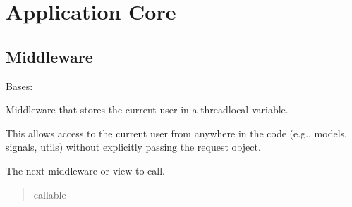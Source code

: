\documentclass[letterpaper,10pt,english]{sphinxmanual}
\begin{document}
\sphinxstepscope


\chapter{Application Core}
\label{\detokenize{core:application-core}}\label{\detokenize{core::doc}}

\section{Middleware}
\label{\detokenize{core:module-core.middleware}}\label{\detokenize{core:middleware}}

\begin{fulllineitems}
\label{\detokenize{core:core.middleware.CurrentUserMiddleware}}
\pysigstartsignatures
\pysiglinewithargsret
{}
{}
{}
\pysigstopsignatures
\sphinxAtStartPar
Bases: 

\sphinxAtStartPar
Middleware that stores the current user in a thread\sphinxhyphen{}local variable.

\sphinxAtStartPar
This allows access to the current user from anywhere in the code
(e.g., models, signals, utils) without explicitly passing the request object.

\begin{fulllineitems}
\label{\detokenize{core:core.middleware.CurrentUserMiddleware.get_response}}
\pysigstartsignatures
\pysigline
{}
\pysigstopsignatures
\sphinxAtStartPar
The next middleware or view to call.
\begin{quote}\begin{description}
\sphinxAtStartPar
callable

\end{description}\end{quote}

\end{fulllineitems}


\end{fulllineitems}
\end{document}
